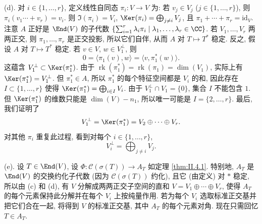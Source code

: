 \begin{solution}
(d). 对 $i \in \{1, \ldots, r\}$, 定义线性自同态 $\pi_i \colon V \to V$ 为: 若 $v_j \in V_j$ ($j \in \{1, \ldots, r\}$), 则 $\pi_i(v_1 \cdots + v_r) = v_i$. 则 $\Im(\pi_i) = V_i$, $\Ker(\pi_i) = \bigoplus_{j \neq i}V_j$, 且 $\pi_1 + \cdots + \pi_r = \mathrm{id}_V$. 注意 $A$ 正好是 $\End(V)$ 的子代数 $\{\sum_{i=1}^r\lambda_i\pi_i \mid \lambda_1, \ldots, \lambda_r \in \CC\}$.
若 $V_1, \ldots, V_r$ 两两正交, 则 $\pi_1, \ldots, \pi_r$ 是正交投影, 所以它们自伴, 从而 $A$ 对 $T \longmapsto T^*$ 稳定.
反之, 假设 $A$ 对 $T \longmapsto T^*$ 稳定. 若 $v \in V$, $w \in V_1^{\perp}$, 则
\[
0 = \langle \pi_1(v), w \rangle = \langle v, \pi_1^*(w) \rangle.
\]
这蕴含 $V_1^{\perp} \subset \Ker(\pi_1^*)$. 由于 $\operatorname{rk}(\pi_1^*) = \operatorname{rk}(\pi_1) = \dim(V_1)$, 实际上有 $\Ker(\pi_1^*) = V_1^{\perp}$. 但 $\pi_1^* \in A$, 所以 $\pi_1^*$ 的每个特征空间都是 $V_i$ 的和, 因此存在 $I \subset \{1, \ldots, r\}$ 使得 $\Ker(\pi_1^*) = \bigoplus_{i \in I}V_i$. 由于 $V_1^{\perp} \cap V_1 = \{0\}$, 集合 $I$ 不能包含 $1$. 但 $\Ker(\pi_1^*)$ 的维数只能是 $\dim(V) - n_1$, 所以唯一可能是 $I = \{2, \ldots, r\}$. 最后, 我们证明了
\[
V_1^{\perp} = \Ker(\pi_1^*) = V_2 \oplus \cdots \oplus V_r.
\]
对其他 $\pi_i$ 重复此过程, 看到对每个 $i \in \{1, \ldots, r\}$,
\[
V_i^{\perp} = \bigoplus_{j \neq i}V_j.
\]

(e). 设 $T \in \End(V)$, 设 $\Phi \colon \mathcal{C}(\sigma(T)) \to A_T$ 如定理 \ref{thm:II.4.1}. 特别地, $A_T$ 是 $\End(V)$ 的交换约化子代数 (因为 $\mathcal{C}(\sigma(T))$ 约化), 且它 (由定义) 对 $*$ 稳定, 所以由 (c) 和 (d), 有 $V$ 分解成两两正交子空间的直和 $V = V_1 \oplus \cdots \oplus V_r$, 使得 $A_T$ 的每个元素保持此分解并在每个 $V_i$ 上按纯量作用. 若为每个 $V_i$ 选取标准正交基并把它们合在一起, 将得到 $V$ 的标准正交基, 其中 $A_T$ 的每个元素对角. 现在只需回忆 $T \in A_T$.
\end{solution}

